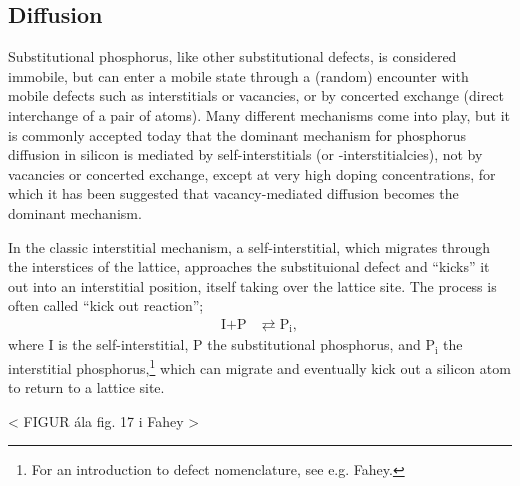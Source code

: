 \documentclass[11pt,bibliography=totoc,index=totoc]{scrbook}   %
\begin{document}
\subsection{Diffusion}\label{sec:PDiffusion}
%

Substitutional phosphorus, like other substitutional defects, is considered immobile, but can enter a mobile state through a (random) encounter with mobile defects such as interstitials or vacancies, or by concerted exchange (direct interchange of a pair of atoms).
Many different mechanisms come into play, but it is commonly accepted today that the dominant mechanism for phosphorus diffusion in silicon is mediated by self-interstitials (or -interstitialcies), not by vacancies or concerted exchange, except at very high doping concentrations, for which it has been suggested that vacancy-mediated diffusion becomes the dominant mechanism.\cite{Ural:1999,Bentzen:2006}

In the classic interstitial mechanism, a self-interstitial, which migrates through the interstices of the lattice, approaches the substituional defect and ``kicks'' it out into an interstitial position, itself taking over the lattice site. The process is often called ``kick out reaction'';\cite{Fahey:1989}
\begin{align*}
    \text{I} + \text{P} &\rightleftarrows \text{P}_{\text{i}},
\end{align*}
where I is the self-interstitial, P the substitutional phosphorus, and P$_{\text{i}}$ the interstitial phosphorus,\footnote{For an introduction to defect nomenclature, see e.g. Fahey\cite{Fahey:1989}.} which can migrate and eventually kick out a silicon atom to return to a lattice site.

< FIGUR ála fig. 17 i Fahey >
\end{document}

